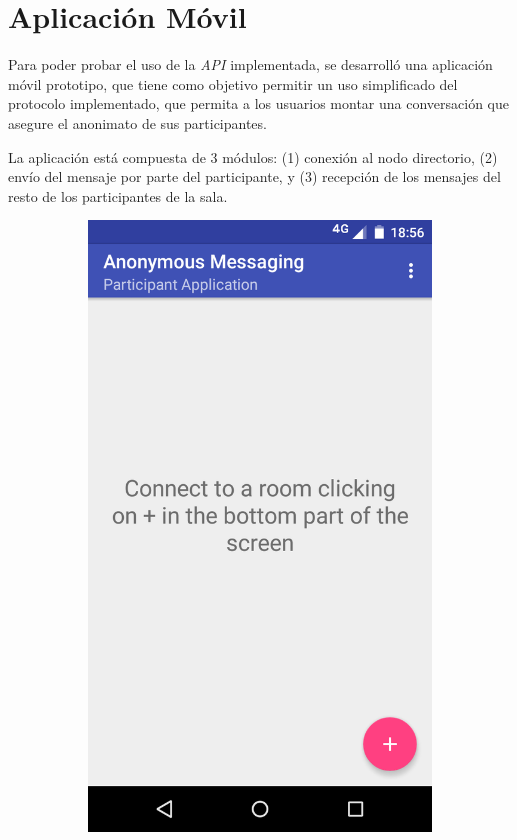 \section{Aplicación Móvil}

Para poder probar el uso de la \emph{API} implementada, se desarrolló una 
aplicación móvil prototipo, que tiene como objetivo permitir un uso simplificado 
del protocolo implementado, que permita a los usuarios montar una conversación 
que asegure el anonimato de sus participantes.

La aplicación está compuesta de 3 módulos: (1) conexión al nodo directorio, (2) envío 
del mensaje por parte del participante, y (3) recepción de los mensajes 
del resto de los participantes de la sala.

\begin{figure}[h]
    \centering
    \begin{subfigure}[b]{0.4\textwidth}
        \includegraphics[width=\textwidth]{imagenes/mobile_first.png}

\end{subfigure}
\end{figure}
